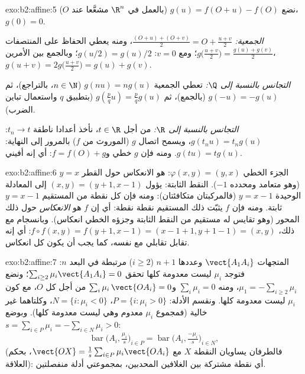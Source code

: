 \begin{solution}{exo:b2:affine:5}
نضع $g(u) = f(O + u) - f(O)$ (بالعمل في $\R^n$ مشعَّعا عند $O$)، $g(0) = 0$.

\emph{الجمعية:} $\frac{(O + u) + (O + v)}{2} = O + \frac{u +
v}{2}$، ومنه يعطي الحفاظ على المنتصفات $g\bigl(\frac{u+v}{2}\bigr)
= \frac{g(u) + g(v)}{2}$؛ ومع
$v = 0$: $g(u/2) = g(u)/2$؛ وبالجمع بين الأمرين، $g(u + v) = 2g\bigl(\frac{u+v}{2}\bigr) = g(u) + g(v)$.

\emph{التجانس بالنسبة إلى $\Q$:} تعطي الجمعية $g(nu) = ng(u)$ ($n \in
\N$،
بالتراجع)، ثم $g(-u) = -g(u)$ (بالجمع)، ثم $g(\frac pq u) =
\frac pq g(u)$ (بتطبيق $q$ واستعمال تباين
الضرب).

\emph{التجانس بالنسبة إلى $\R$:} من أجل $t \in \R$، نأخذ أعدادا ناطقة
$t_n \to
t$: $g(t_nu) = t_ng(u)$، ويسمح اتصال $g$ (الموروث من $f$) بالمرور إلى
النهاية: $g(tu) = tg(u)$. ومنه فإن $g$ خطي و$f =
f(O) + g$: أي إنه أفيني.
\end{solution}

\begin{solution}{exo:b2:affine:6}
الجزء الخطي $\varphi(x,y) = (y, x)$: هو الانعكاس حول القطر $y = x$ (وهو متعامد ومحدده
$-1$). النقط الثابتة: يؤول $(x, y) = (y
+ 1, x - 1)$ إلى المعادلة الوحيدة $y = x - 1$
(فالمركبتان متكافئتان): ومنه فإن كل نقطة من المستقيم $y = x - 1$ ثابتة.
ومنه فإن $f$ يثبّت ذلك المستقيم نقطة نقطة: أي إن $f$ هو
\emph{الانعكاس} حول ذلك المحور (وهو تقايس له مستقيم من النقط الثابتة
وجزؤه الخطي انعكاس). وبانسجام مع ذلك، $f \circ
f(x,y) = f(y+1, x-1) = (x - 1 + 1, y + 1 - 1) = (x, y)$: أي إنه تقابل تقابلي
مع نفسه، كما يجب أن يكون كل انعكاس.
\end{solution}

\begin{solution}{exo:b2:affine:7}
المتجهات $\vect{A_1A_i}$ وعددها $n + 1$ ($i \geq 2$) مرتبطة في البعد $n$: فتوجد
$\mu_i$ ليست معدومة كلها تحقق $\sum_{i\geq2}
\mu_i\vect{A_1A_i} = 0$؛ ونضع $\mu_1 = -\sum_{i \geq 2}\mu_i$، ومنه $\sum_{i}\mu_i = 0$
و$\sum_i \mu_i\,\vect{OA_i} = 0$ من أجل كل $O$، مع كون $\mu_i$ ليست معدومة كلها. ونقسم
الأدلة: $P = \{i : \mu_i >
0\}$، $N = \{i : \mu_i < 0\}$، وكلتاهما غير خالية (فمجموع $\mu_i$ معدوم
وهي ليست معدومة كلها). وبوضع $s = \sum_{i\in P}\mu_i =
-\sum_{i \in N}\mu_i > 0$:
\[
\operatorname{bar}\bigl(A_i, \tfrac{\mu_i}{s}\bigr)_{i \in P}
= \operatorname{bar}\bigl(A_i, \tfrac{-\mu_i}{s}\bigr)_{i \in N},
\]
(فالطرفان يساويان النقطة $X$ مع $\vect{OX} = \frac1s\sum_{i\in
P}\mu_i\vect{OA_i}$، بحكم العلاقة): أي نقطة
مشتركة بين الغلافين المحدبين، بمجموعتي أدلة منفصلتين.
\end{solution}

